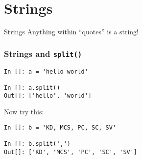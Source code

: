 \documentclass[14pt,compress]{beamer}
\newcounter{time}
\newcommand{\inctime}[1]{\addtocounter{time}{#1}{\tiny \thetime\ m}}
\newcommand{\typ}[1]{\lstinline{#1}}
\begin{document}
\section{Strings}
\begin{frame}{Strings}
Anything within ``quotes'' is a string!
\end{frame}

\begin{frame}[fragile]\frametitle{Strings and \typ{split()}}
  \begin{lstlisting}
In []: a = 'hello world'

In []: a.split()
Out[]: ['hello', 'world']
  \end{lstlisting}
Now try this:
  \begin{lstlisting}
In []: b = 'KD, MCS, PC, SC, SV'

In []: b.split(',')
Out[]: ['KD', 'MCS', 'PC', 'SC', 'SV']
  \end{lstlisting}
\inctime{5}
\end{frame}
\end{document}
